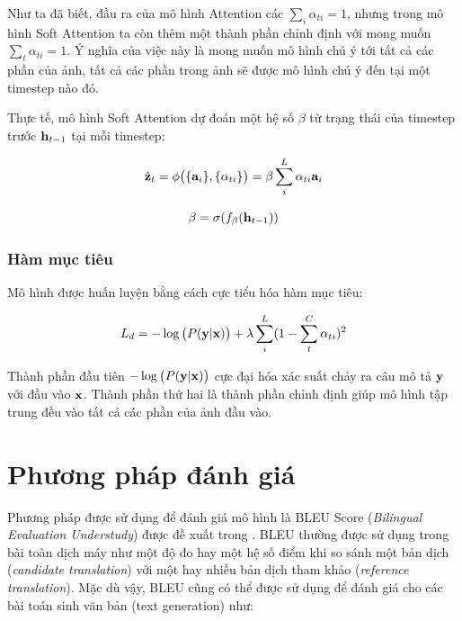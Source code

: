 \documentclass[14pt, a4paper]{article}
\numberwithin{equation}{section}
\numberwithin{algorithm}{section}
\numberwithin{figure}{section}
\numberwithin{table}{section}
\numberwithin{dl}{section}
\numberwithin{md}{section}
\numberwithin{bd}{section}
\numberwithin{dn}{section}
\numberwithin{hq}{section}
\begin{document}
    Như ta đã biết, đầu ra của mô hình Attention các $\sum_i \alpha_{ti}=1$, nhưng trong mô hình Soft Attention ta còn thêm một thành phần chỉnh định với mong muốn $\sum_{t} \alpha_{ti}=1$.
    Ý nghĩa của việc này là mong muốn mô hình chú ý tới tất cả các phần của ảnh, tất cả các phần trong ảnh sẽ được mô hình chú ý đến tại một timestep nào đó.

    Thực tế, mô hình Soft Attention dự đoán một hệ số $\beta$ từ trạng thái của timestep trước $\bold{h}_{t-1}$ tại mỗi timestep:
    
    \begin{equation}
        \hat{\bold{z}}_t=\phi\big( \lbrace \bold{a}_i \rbrace, \lbrace \alpha_{ti} \rbrace \big)=\beta \sum_{i}^L \alpha_{ti} \bold{a}_i
    \end{equation}

    \begin{equation}
        \beta = \sigma(f_{\beta}(\bold{h}_{t-1}))
    \end{equation}

    \subsubsection{Hàm mục tiêu}

    Mô hình được huấn luyện bằng cách cực tiểu hóa hàm mục tiêu:

    \begin{equation}
        L_d=-\log\big( P(\bold{y} \vert \bold{x}) \big) + \lambda \sum_i^L (1-\sum_t^C \alpha_{ti})^2
    \end{equation}

    
    Thành phần đầu tiên $-\log\big( P(\bold{y} \vert \bold{x}) \big)$ cực đại hóa xác suất chảy ra câu mô tả $\bold{y}$ với đầu vào $\bold{x}$. 
    Thành phần thứ hai là thành phần chỉnh định giúp mô hình tập trung đều vào tất cả các phần của ảnh đầu vào.

    \section{Phương pháp đánh giá}

    Phương pháp được sử dụng để đánh giá mô hình là BLEU Score (\textit{Bilingual Evaluation Understudy}) được đề xuất trong \cite{papineni2002bleu}.
    BLEU thường được sử dụng trong bài toàn dịch máy như một độ đo hay một hệ số điểm khi so sánh một bản dịch (\textit{candidate translation}) với một hay nhiều bản dịch tham khảo (\textit{reference translation}). Mặc dù vậy, BLEU cũng có thể được sử dụng để đánh giá cho các bài toán sinh văn bản (text generation) như:
\end{document}
